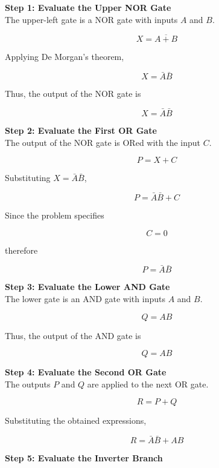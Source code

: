 \documentclass[12pt,a4paper]{article}
\begin{document}
\begin{solutionbox}

\textbf{Step 1: Evaluate the Upper NOR Gate} \\

The upper-left gate is a NOR gate with inputs $A$ and $B$.

\[
X=\overline{A+B}
\]

Applying De Morgan's theorem,

\[
X=\bar A\bar B
\]

Thus, the output of the NOR gate is

\[
\boxed{X=\bar A\bar B}
\]

\vspace{0.3cm}

\textbf{Step 2: Evaluate the First OR Gate} \\

The output of the NOR gate is ORed with the input $C$.

\[
P=X+C
\]

Substituting $X=\bar A\bar B$,

\[
P=\bar A\bar B+C
\]

Since the problem specifies

\[
C=0
\]

therefore

\[
P=\bar A\bar B
\]

\vspace{0.3cm}

\textbf{Step 3: Evaluate the Lower AND Gate} \\

The lower gate is an AND gate with inputs $A$ and $B$.

\[
Q=AB
\]

Thus, the output of the AND gate is

\[
\boxed{Q=AB}
\]

\vspace{0.3cm}

\textbf{Step 4: Evaluate the Second OR Gate} \\

The outputs $P$ and $Q$ are applied to the next OR gate.

\[
R=P+Q
\]

Substituting the obtained expressions,

\[
R=\bar A\bar B+AB
\]

\vspace{0.3cm}
\textbf{Step 5: Evaluate the Inverter Branch} \\


\end{solutionbox}
\end{document}
